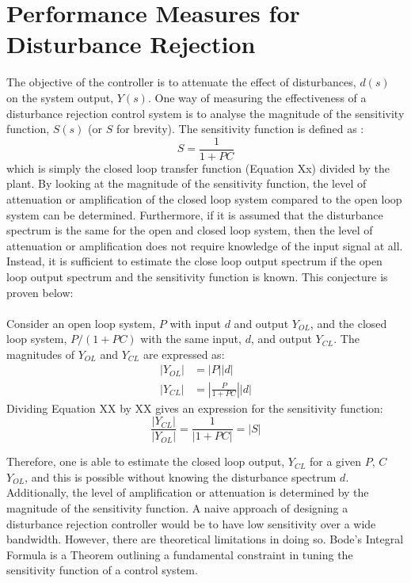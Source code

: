 \section{Performance Measures for Disturbance Rejection}
The objective of the controller is to attenuate the effect of disturbances, $d(s)$ on the system output, $Y(s)$. One way of measuring the effectiveness of a disturbance rejection control system is to analyse the magnitude of the sensitivity function, $S(s)$ (or $S$ for brevity). The sensitivity function is defined as \cite{astrom2010feedback}:
\begin{equation}
    S = \frac{1}{1+PC}
\end{equation}
which is simply the closed loop transfer function (Equation Xx) divided by the plant. By looking at the magnitude of the sensitivity function, the level of attenuation or amplification of the closed loop system compared to the open loop system can be determined. Furthermore, if it is assumed that the disturbance spectrum is the same for the open and closed loop system, then the level of attenuation or amplification does not require knowledge of the input signal at all. Instead, it is sufficient to estimate the close loop output spectrum if the open loop output spectrum and the sensitivity function is known. This conjecture is proven below:
\\~\\
Consider an open loop system, $P$ with input $d$ and output $Y_{OL}$, and the closed loop system, $P/(1+PC)$ with the same input, $d$, and output $Y_{CL}$. The magnitudes of $Y_{OL}$ and $Y_{CL}$ are expressed as:
\begin{align}
    |Y_{OL}| &= |P||d| \\
     |Y_{CL}| &= |\frac{P}{1+PC}||d| 
\end{align}
Dividing Equation XX by XX gives an expression for the sensitivity function:
\begin{equation}
 \frac{|Y_{CL}|}{|Y_{OL}|} = \frac{1}{|1+PC|} = |S| 
\end{equation}



Therefore, one is able to estimate the closed loop output, $Y_{CL}$ for a given $P$, $C$ $Y_{OL}$, and this is possible without knowing the disturbance spectrum $d$. Additionally, the level of amplification or attenuation is determined by the magnitude of the sensitivity function. A naive approach of designing a disturbance rejection controller would be to have low sensitivity over a wide bandwidth. However, there are theoretical limitations in doing so. Bode's Integral Formula is a Theorem outlining a fundamental constraint in tuning the sensitivity function of a control system.

